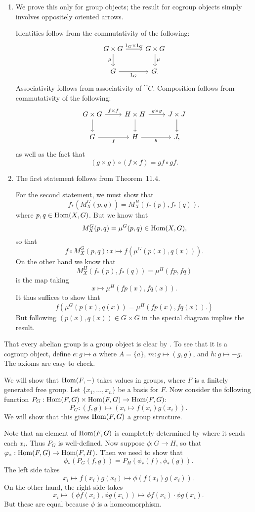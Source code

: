 \documentclass[../../solutions.tex]{subfiles}
\begin{document}
\begin{exercise} \leavevmode
\begin{enumerate}
\item
We prove this only for group objects; the result for cogroup objects simply involves oppositely oriented arrows.

Identities follow from the commutativity of the following:
\[
\begin{tikzcd}
G\times G\ar[d,"\mu",swap]\ar[r,"1_G\times1_G"] & G\times G\ar[d,"\mu"] \\
G\ar[r,"1_G",swap] & G.
\end{tikzcd}
\]
Associativity follows from associativity of $\cat C$.
Composition follows from commutativity of the following:
\[
\begin{tikzcd}
G\times G\ar[r,"f\times f"]\ar[d] & H\times H\ar[r,"g\times g"]\ar[d] & J\times J\ar[d] \\
G\ar[r,"f",swap] & H\ar[r,"g",swap] & J,
\end{tikzcd}
\]
as well as the fact that
\[(g\times g)\circ(f\times f)=gf\circ gf.\]

\item
The first statement follows from Theorem~11.4.

For the second statement, we must show that
\[f_*(M_X^G(p,q))=M_X^H(f_*(p),f_*(q)),\]
where $p,q\in\operatorname{Hom}(X,G)$.
But we know that
\[M_X^G(p,q)=\mu^G(p,q)\in\operatorname{Hom}(X,G),\]
so that
\[f\circ M_X^G(p,q):x\mapsto f(\mu^G(p(x),q(x))).\]
On the other hand we know that
\[M_X^H(f_*(p),f_*(q))=\mu^H(fp,fq)\]
is the map taking
\[x\mapsto\mu^H(fp(x),fq(x)).\]
It thus suffices to show that
\[f(\mu^G(p(x),q(x))=\mu^H(fp(x),fq(x)).)\]
But following $(p(x),q(x))\in G\times G$ in the special diagram implies the result.
\end{enumerate}
\end{exercise}

\begin{exercise} \leavevmode
That every abelian group is a group object is clear by .
To see that it is a cogroup object, define $e:g\mapsto a$ where $A=\{a\}$, $m:g\mapsto(g,g)$, and $h:g\mapsto -g$.
The axioms are easy to check.
\end{exercise}

\begin{exercise} \leavevmode
We will show that $\operatorname{Hom}(F,-)$ takes values in groups, where $F$ is a finitely generated free group.
Let $\{x_1,\dots,x_n\}$ be a basis for $F$.
Now consider the following function $P_G:\operatorname{Hom}(F,G)\times\operatorname{Hom}(F,G)\to\operatorname{Hom}(F,G)$:
\[P_G:(f,g)\mapsto (x_i\mapsto f(x_i)g(x_i)).\]
We will show that this gives $\operatorname{Hom}(F,G)$ a group structure.

Note that an element of $\operatorname{Hom}(F,G)$ is completely determined by where it sends each $x_i$.
Thus $P_G$ is well-defined.
Now suppose $\phi:G\to H$, so that $\varphi_*:\operatorname{Hom}(F,G)\to\operatorname{Hom}(F,H)$.
Then we need to show that
\[\phi_*(P_G(f,g))=P_H(\phi_*(f),\phi_*(g)).\]
The left side takes
\[x_i\mapsto f(x_i)g(x_i)\mapsto\phi(f(x_i)g(x_i)).\]
On the other hand, the right side takes
\[x_i\mapsto(\phi f(x_i),\phi g(x_i))\mapsto\phi f(x_i)\cdot\phi g(x_i).\]
But these are equal because $\phi$ is a homeomorphism.
\end{exercise}
\end{document}

